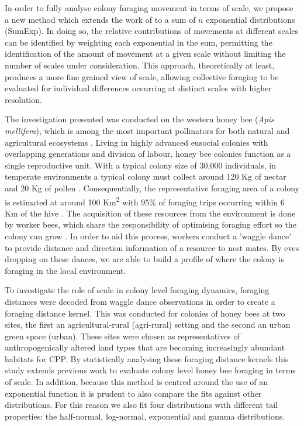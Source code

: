 \documentclass[11pt,usenames,dvipsnames]{article}
\begin{document}
In order to fully analyse colony foraging movement in terms of scale, we propose a new method which extends the work of \cite{Petrovskii2011} to a sum of $n$ exponential distributions (SumExp). In doing so, the relative contributions of movements at different scales can be identified by weighting each exponential in the sum, permitting the identification of the amount of movement at a given scale without limiting the number of scales under consideration. This approach, theoretically at least, produces a more fine grained view of scale, allowing collective foraging to be evaluated for individual differences occurring at distinct scales with higher resolution.

The investigation presented was conducted on the western honey bee (\textit{Apis mellifera}), which is among the most important pollinators for both natural and agricultural ecosystems \citep{Albrecht2018}. Living in highly advanced eusocial colonies with overlapping generations and division of labour, honey bee colonies function as a single reproductive unit. With a typical colony size of 30,000 individuals, in temperate environments a typical colony must collect around 120 Kg of nectar and 20 Kg of pollen \citep{Seeley1995}. Consequentially, the representative foraging area of a colony is estimated at around 100 Km\textsuperscript{2} with 95\% of foraging trips occurring within 6 Km of the hive \citep{Samuelson2017}. The acquisition of these resources from the environment is done by worker bees, which share the responsibility of optimising foraging effort so the colony can grow \citep{Samuelson2017}. In order to aid this process, workers conduct a 'waggle dance' to provide distance and direction information of a resource to nest mates. By eves dropping on these dances, we are able to build a profile of where the colony is foraging in the local environment.

To investigate the role of scale in colony level foraging dynamics, foraging distances were decoded from waggle dance observations in order to create a foraging distance kernel. This was conducted for colonies of honey bees at two sites, the first an agricultural-rural (agri-rural) setting and the second an urban green space (urban). These sites were chosen as representatives of anthropogenically altered land types that are becoming increasingly abundant habitats for CPP. By statistically analysing these foraging distance kernels this study extends previous work to evaluate colony level honey bee foraging in terms of scale. In addition, because this method is centred around the use of an exponential function it is prudent to also compare the fits against other distributions. For this reason we also fit four distributions with different tail properties: the half-normal, log-normal, exponential and gamma distributions. 
\end{document}
